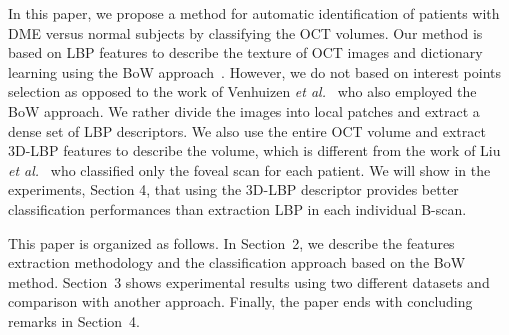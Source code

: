 In this paper, we propose a method for automatic identification of patients with DME versus normal subjects by classifying the OCT volumes. Our method is based on LBP features to describe the texture of OCT images and dictionary learning using the BoW approach~\cite{Sivic2003}.
However, we do not based on interest points selection as opposed to the work of 
Venhuizen \textit{et al.}~\cite{Venhuizen2015} who also employed the BoW approach. We rather divide the images into local patches and extract a dense set of LBP descriptors.
We also use the entire OCT volume and extract 3D-LBP features to describe the volume, which is different from the work of Liu \textit{et al.}~\cite{Liu2011} who classified only the foveal scan for each patient.
We will show in the experiments, Section 4, that using the 3D-LBP descriptor provides better classification performances than extraction LBP in each individual B-scan.

This paper is organized as follows. In Section~2, we describe the features extraction methodology and the classification approach based on the BoW method.
Section~3 shows experimental results using two different datasets and comparison with another approach. Finally, the paper ends with concluding remarks in Section~4.



